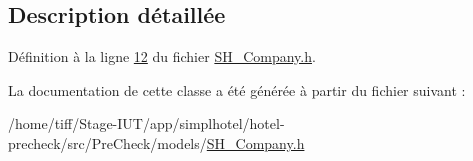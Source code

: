 \subsection{Description détaillée}


Définition à la ligne \hyperlink{SH__Company_8h_source_l00012}{12} du fichier \hyperlink{SH__Company_8h_source}{S\-H\-\_\-\-Company.\-h}.



La documentation de cette classe a été générée à partir du fichier suivant \-:\begin{DoxyCompactItemize}
\item 
/home/tiff/\-Stage-\/\-I\-U\-T/app/simplhotel/hotel-\/precheck/src/\-Pre\-Check/models/\hyperlink{SH__Company_8h}{S\-H\-\_\-\-Company.\-h}\end{DoxyCompactItemize}
